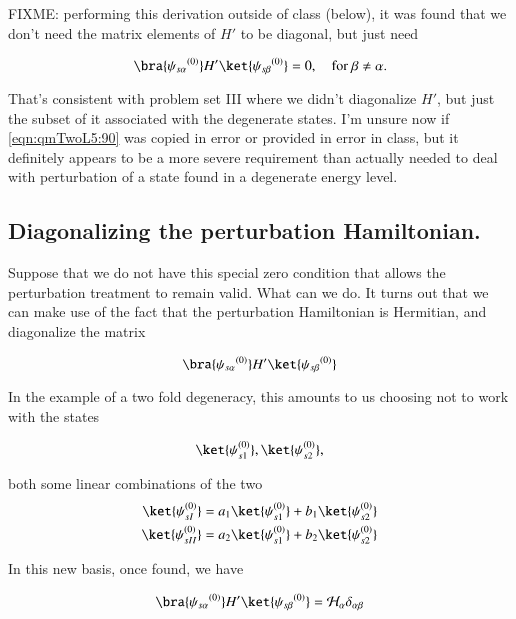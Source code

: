 FIXME: performing this derivation outside of class (below), it was found that we don't need the matrix elements of $H'$ to be diagonal, but just need

\begin{equation}\label{eqn:qmTwoL5:90b}
\bra{{\psi_{s \alpha}}^{(0)}} H' \ket{{\psi_{s \beta}}^{(0)}} = 0, \quad \mbox{for $\beta \ne \alpha$}.
\end{equation}

That's consistent with problem set III where we didn't diagonalize $H'$, but just the subset of it associated with the degenerate states.  I'm unsure now if \ref{eqn:qmTwoL5:90} was copied in error or provided in error in class, but it definitely appears to be a more severe requirement than actually needed to deal with perturbation of a state found in a degenerate energy level.



\subsection{Diagonalizing the perturbation Hamiltonian.}

Suppose that we do not have this special zero condition that allows the perturbation treatment to remain valid.  What can we do.  It turns out that we can make use of the fact that the perturbation Hamiltonian is Hermitian, and diagonalize the matrix

\begin{equation}\label{eqn:qmTwoL5:110}
\bra{{\psi_{s \alpha}}^{(0)}} H' \ket{{\psi_{s \beta}}^{(0)}} 
\end{equation}

In the example of a two fold degeneracy, this amounts to us choosing not to work with the states

\begin{equation}\label{eqn:qmTwoL5:130}
\ket{\psi_{s1}^{(0)}}, \ket{\psi_{s2}^{(0)}},
\end{equation}

both some linear combinations of the two
\begin{align}\label{eqn:qmTwoL5:150}
\ket{\psi_{sI}^{(0)}} &= a_1 \ket{\psi_{s1}^{(0)}} + b_1 \ket{\psi_{s2}^{(0)}} \\
\ket{\psi_{sII}^{(0)}} &= a_2 \ket{\psi_{s1}^{(0)}} + b_2 \ket{\psi_{s2}^{(0)}} 
\end{align}

In this new basis, once found, we have

\begin{equation}\label{eqn:qmTwoL5:170}
\bra{{\psi_{s \alpha}}^{(0)}} H' \ket{{\psi_{s \beta}}^{(0)}} = \mathcal{H}_\alpha \delta_{\alpha \beta}
\end{equation}

